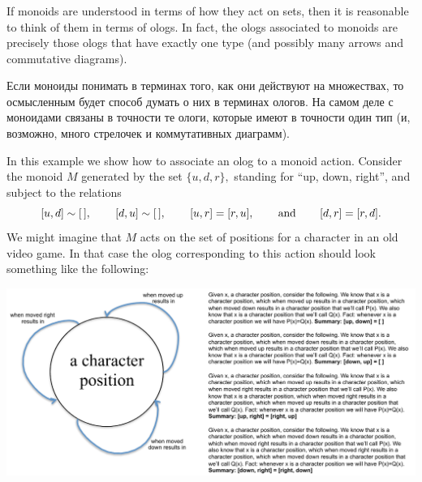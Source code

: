 \documentclass[CT4S-EN-RU]{subfiles}
\begin{document}

\subsubsection{}

\begin{blockENG}
If monoids are understood in terms of how they act on sets, then it is reasonable to think of them in terms of ologs. In fact, the ologs associated to monoids are precisely those ologs that have exactly one type (and possibly many arrows and commutative diagrams).
\end{blockENG}

\begin{blockRUS}
Если моноиды понимать в терминах того, как они действуют на множествах, то осмысленным будет способ думать о них в терминах ологов. На самом деле с моноидами связаны в точности те ологи, которые имеют в точности один тип (и, возможно, много стрелочек и коммутативных диаграмм).
\end{blockRUS}

\begin{exampleENG}\label{ex:monoid as olog}
In this example we show how to associate an olog to a monoid action. Consider the monoid $M$ generated by the set $\{u,d,r\},$ standing for “up, down, right”, and subject to the relations $$[u,d]\sim[\,],\hspace{.3in}[d,u]\sim[\,],\hspace{.3in}[u,r]=[r,u],\hspace{.3in} \textnormal{and}\hspace{.3in} [d,r]=[r,d].$$
We might imagine that $M$ acts on the set of positions for a character in an old video game. In that case the olog corresponding to this action should look something like the following:
\begin{center}
\includegraphics[width=\textwidth]{monoidOlog}
\end{center}
\end{exampleENG}
\end{document}
